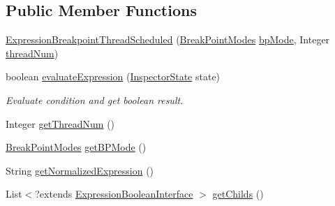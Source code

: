 \subsection*{Public Member Functions}
\begin{DoxyCompactItemize}
\item 
\hyperlink{classgov_1_1nasa_1_1jpf_1_1inspector_1_1server_1_1expression_1_1expressions_1_1_expression_breakpoint_thread_scheduled_a27c0a4f5c2d0d69769b44546bdea84c3}{Expression\+Breakpoint\+Thread\+Scheduled} (\hyperlink{enumgov_1_1nasa_1_1jpf_1_1inspector_1_1server_1_1breakpoints_1_1_break_point_modes}{Break\+Point\+Modes} \hyperlink{classgov_1_1nasa_1_1jpf_1_1inspector_1_1server_1_1expression_1_1expressions_1_1_expression_breakpoint_thread_scheduled_af02859d11279a41920bbebb982288795}{bp\+Mode}, Integer \hyperlink{classgov_1_1nasa_1_1jpf_1_1inspector_1_1server_1_1expression_1_1expressions_1_1_expression_breakpoint_thread_scheduled_ada71b9ee313dfce2cd7b53c32cb0d3a8}{thread\+Num})
\item 
boolean \hyperlink{classgov_1_1nasa_1_1jpf_1_1inspector_1_1server_1_1expression_1_1expressions_1_1_expression_breakpoint_thread_scheduled_af4d7f87f622cea92aeaf4bdfe7d277b7}{evaluate\+Expression} (\hyperlink{interfacegov_1_1nasa_1_1jpf_1_1inspector_1_1server_1_1expression_1_1_inspector_state}{Inspector\+State} state)
\begin{DoxyCompactList}\small\item\em Evaluate condition and get boolean result. \end{DoxyCompactList}\item 
Integer \hyperlink{classgov_1_1nasa_1_1jpf_1_1inspector_1_1server_1_1expression_1_1expressions_1_1_expression_breakpoint_thread_scheduled_a88c34f41dd43d0a3ab885230d9bbccc6}{get\+Thread\+Num} ()
\item 
\hyperlink{enumgov_1_1nasa_1_1jpf_1_1inspector_1_1server_1_1breakpoints_1_1_break_point_modes}{Break\+Point\+Modes} \hyperlink{classgov_1_1nasa_1_1jpf_1_1inspector_1_1server_1_1expression_1_1expressions_1_1_expression_breakpoint_thread_scheduled_ac02b6383a2918d35d4307c4c0f2d58be}{get\+B\+P\+Mode} ()
\item 
String \hyperlink{classgov_1_1nasa_1_1jpf_1_1inspector_1_1server_1_1expression_1_1expressions_1_1_expression_breakpoint_thread_scheduled_ac6614c7f9eaed48ef50a3ebedb5b41c6}{get\+Normalized\+Expression} ()
\item 
List$<$?extends \hyperlink{interfacegov_1_1nasa_1_1jpf_1_1inspector_1_1server_1_1expression_1_1_expression_boolean_interface}{Expression\+Boolean\+Interface} $>$ \hyperlink{classgov_1_1nasa_1_1jpf_1_1inspector_1_1server_1_1expression_1_1_expression_boolean_leaf_aa99bf3cf13bd8cc1d6c33208bc83b185}{get\+Childs} ()

\end{DoxyCompactItemize}
